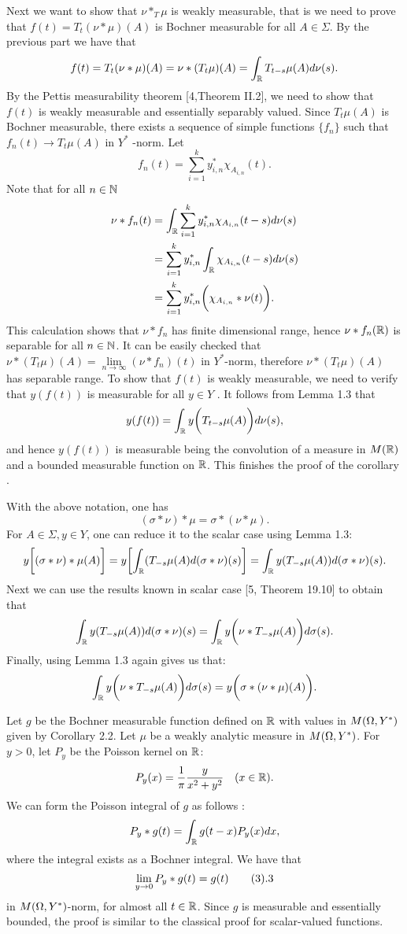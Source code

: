 Next we want to show that $\nu\ast_T \mu $ is weakly measurable, that is
we need to prove that
$f(t)= T_t (\nu \ast \mu) (A)$
is Bochner measurable for all $A\in \Sigma$.  By the previous part
we have that
$$ f(t)= T_t (\nu \ast \mu) (A)= \nu \ast (T_t\mu) (A)= \int_{\Bbb R}
T_{t-s} \mu
(A) d\nu(s). $$
By the Pettis measurability theorem [4,Theorem II.2], we need to
show that
$f(t)$ is
weakly measurable and essentially separably valued.
 Since $T_t \mu (A)$ is Bochner measurable, there exists a sequence
of simple
functions $\{ f_n \}$ such that
 $f_n(t) \to T_t \mu (A)$ in $Y^*$ -norm. 	Let
$$f_n(t) = \sum_{i=1}^k y_{i,n}^* \chi_{A_{i,n}} (t).$$
Note that for all $n\in \Bbb N$
$$\split\nu \ast f_n(t) &= \int_{\R} \sum_{i=1}^k y_{i,n}^*
\chi_{A_{i,n}}
(t-s) d\nu (s)\\
&=\sum_{i=1}^k y_{i,n}^* \int_{\R} \chi_{A_{i,n}} (t-s)d\nu (s)\\
&=\sum_{i=1}^k y_{i,n}^* \biggl(\chi_{A_{i,n}}\ast \nu (t)
\biggr).\endsplit $$
This calculation shows that $\nu \ast f_n$ has finite dimensional range,
hence $\nu\ast f_n (\Bbb R)$ is separable for all $n\in \Bbb N$.
It can be easily checked that $ \nu\ast (T_t\mu)(A)=
\lim\limits_{n\to \infty}
(\nu\ast f_n)(t)$ in $Y^*$-norm, therefore $\nu \ast (T_t \mu)
(A)$ has separable range.
To show that  $f(t)$ is weakly measurable, we need to verify that
$y(f(t))$ is measurable for all $y\in Y$ . It follows from
Lemma 1.3 that
$$y(f(t)) = \int_{\Bbb R} y\biggl(T_{t-s} \mu (A)\biggr) d\nu(s), $$
and hence $y(f(t))$ is measurable being the convolution of a
measure in $M(\Bbb R)$
 and a bounded measurable function on $\Bbb R$.
This finishes the proof of the corollary .\endprf

 With the above notation, one has
$$(\sigma \ast \nu)\ast \mu = \sigma \ast (\nu\ast \mu).$$\endproclaim
\prf   For $A\in\Sigma, y\in Y$, one can reduce it to the scalar
case using Lemma 1.3:
$$y\biggl[ (\sigma \ast \nu) \ast \mu (A)\biggr] = y\biggl[\int_{\Bbb R}
(T_{-s} \mu (A) d(\sigma \ast \nu) (s)\biggr]
=\int_{\Bbb R} y(T_{-s} \mu (A)) d(\sigma\ast\nu )(s).  $$
 Next we can use the results known in scalar case  [5, Theorem
19.10] to obtain that
$$ \int_{\Bbb R} y(T_{-s} \mu (A)) d(\sigma\ast\nu )(s)  = \int_{\Bbb R}
y\biggl(\nu\ast T_{-s}\mu (A)\biggr) d\sigma
(s).$$
Finally,  using Lemma 1.3 again gives us that:
$$ \int_{\Bbb R} y\biggl(\nu\ast T_{-s}\mu (A)\biggr) d\sigma
(s)=y\biggl ( \sigma \ast (\nu\ast \mu)(A)\biggr). $$
\endprf


Let $g$ be the Bochner measurable function defined on $\Bbb R$ with values in
$M(\Omega, Y^*)$ given by Corollary 2.2.
Let $\mu$ be a weakly analytic measure in $M(\Omega, Y^*)$.  For $y>0$, let $P_y$ be
the Poisson kernel on $\Bbb R$:
$$P_y(x) ={1\over {\pi}} {y\over{x^2 +y^2}} \quad (x\in \Bbb R).$$
We can form the Poisson integral of $g$ as follows :
$$ P_y \ast g(t) = \int_{\Bbb R} g(t-x) P_y(x) dx, $$
where the integral exists as a Bochner integral.
     We have that
$$ \lim_{y\to 0} P_y \ast g(t) = g(t)\tag3.3$$
in $M(\Omega, Y^*)$-norm, for almost all $t\in\Bbb R$.\endproclaim
\prf  Since $g$ is measurable and essentially bounded, the
proof is similar to the classical proof for   scalar-valued
functions. \endprf

